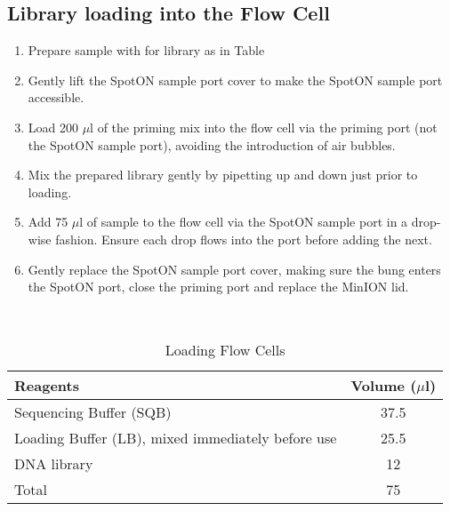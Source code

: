 \subsection{Library loading into the Flow Cell}
\begin{enumerate}
	\item Prepare sample with for library as in Table 
	\item Gently lift the SpotON sample port cover to make the SpotON sample port accessible.
	\item Load 200 $\mu$l of the priming mix into the flow cell via the priming port (not the SpotON sample port), avoiding the introduction of air bubbles.
	\item Mix the prepared library gently by pipetting up and down just prior to loading.
	\item Add 75 $\mu$l of sample to the flow cell via the SpotON sample port in a drop-wise fashion. Ensure each drop flows into the port before adding the next.
	\item Gently replace the SpotON sample port cover, making sure the bung enters the SpotON port, close the priming port and replace the MinION lid.
\end{enumerate}
\

\begin{table}[h]
	\centering
	\begin{tabularx}{0.8\textwidth}{lc}
		\toprule
		Reagents                                          & Volume ($\mu$l) \\ \midrule
		Sequencing Buffer (SQB)                           & 37.5        \\
		Loading Buffer (LB), mixed immediately before use & 25.5        \\
		DNA library                                       & 12          \\
		Total                                             & 75          \\ \bottomrule
	\end{tabularx}
	\caption{Loading Flow Cells}
	\label{tab:ont_loading_flow_cells}
\end{table}